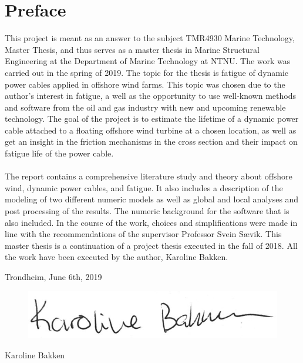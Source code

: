 \hypersetup{pageanchor=true}
%
\chapter*{Preface}
This project is meant as an answer to the subject TMR4930 Marine Technology, Master Thesis, and thus serves as a master thesis in Marine Structural Engineering at the Department of Marine Technology at NTNU. The work was carried out in the spring of 2019. \newline
\newline
The topic for the thesis is fatigue of dynamic power cables applied in offshore wind farms. This topic was chosen due to the author's interest in fatigue, a well as the opportunity to use well-known methods and software from the oil and gas industry with new and upcoming renewable technology. The goal of the project is to estimate the lifetime of a dynamic power cable attached to a floating offshore wind turbine at a chosen location, as well as get an insight in the friction mechanisms in the cross section and their impact on fatigue life of the power cable. \\\\ The report contains a comprehensive literature study and theory about offshore wind, dynamic power cables, and fatigue. It also includes a description of the modeling of two different numeric models as well as global and local analyses and post processing of the results. The numeric background for the software that is also included. In the course of the work, choices and simplifications were made in line with the recommendations of the supervisor Professor Svein Sævik. \newline
\newline
This master thesis is a continuation of a project thesis executed in the fall of 2018. All the work have been executed by the author, Karoline Bakken. 
\newline
\newline
\newline
\newline
\newline
\newline
\begin{center}
    Trondheim, June 6th, 2019
    \end{center}
\begin{figure}[H]
\centering
\includegraphics[scale=0.5]{figures/sign}
\end{figure}
\begin{center}
Karoline Bakken
\end{center}
